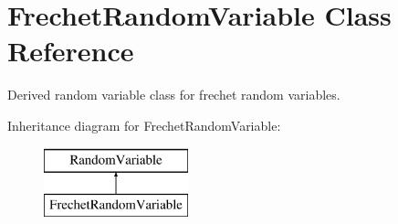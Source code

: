 \section{Frechet\+Random\+Variable Class Reference}
\label{classPecos_1_1FrechetRandomVariable}


Derived random variable class for frechet random variables.  


Inheritance diagram for Frechet\+Random\+Variable\+:\begin{figure}[H]
\begin{center}
\leavevmode
\includegraphics[height=2.000000cm]{classPecos_1_1FrechetRandomVariable}
\end{center}
\end{figure}
